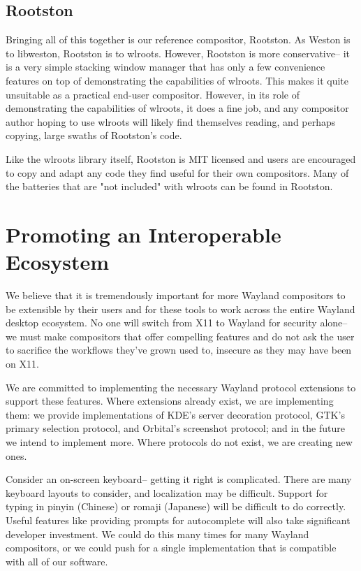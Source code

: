 \documentclass{article}
\begin{document}
\subsection{Rootston}

Bringing all of this together is our reference compositor, Rootston. As Weston
is to libweston, Rootston is to wlroots. However, Rootston is more conservative--
it is a very simple stacking window manager that has only a few convenience
features on top of demonstrating the capabilities of wlroots. This makes it
quite unsuitable as a practical end-user compositor. However, in its role of
demonstrating the capabilities of wlroots, it does a fine job, and any
compositor author hoping to use wlroots will likely find themselves reading, and
perhaps copying, large swaths of Rootston's code.

Like the wlroots library itself, Rootston is MIT licensed and users are
encouraged to copy and adapt any code they find useful for their own
compositors. Many of the batteries that are "not included" with wlroots can be
found in Rootston.

\section{Promoting an Interoperable Ecosystem}

We believe that it is tremendously important for more Wayland compositors to be
extensible by their users and for these tools to work across the entire Wayland
desktop ecosystem. No one will switch from X11 to Wayland for security alone--
we must make compositors that offer compelling features and do not ask the user
to sacrifice the workflows they've grown used to, insecure as they may have been
on X11.

We are committed to implementing the necessary Wayland protocol extensions to
support these features. Where extensions already exist, we are implementing
them: we provide implementations of KDE's server decoration protocol, GTK's
primary selection protocol, and Orbital's screenshot protocol; and in the
future we intend to implement more. Where protocols do not exist, we are
creating new ones.

Consider an on-screen keyboard-- getting it right is complicated. There are
many keyboard layouts to consider, and localization may be difficult. Support
for typing in pinyin (Chinese) or romaji (Japanese) will be difficult to do
correctly. Useful features like providing prompts for autocomplete will also
take significant developer investment. We could do this many times for many
Wayland compositors, or we could push for a single implementation that is
compatible with all of our software.
\end{document}
